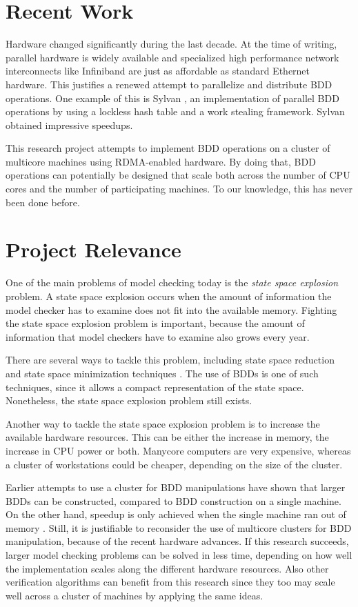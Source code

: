 \section{Recent Work}
Hardware changed significantly during the last decade. At the time of writing, parallel hardware is widely available and specialized high performance network interconnects like Infiniband are just as affordable as standard Ethernet hardware. This justifies a renewed attempt to parallelize and distribute BDD operations. One example of this is Sylvan \cite{sylvan_multicore_bdd}, an implementation of parallel BDD operations by using a lockless hash table and a work stealing framework. Sylvan obtained impressive speedups.

This research project attempts to implement BDD operations on a cluster of multicore machines using RDMA-enabled hardware. By doing that, BDD operations can potentially be designed that scale both across the number of CPU cores and the number of participating machines. To our knowledge, this has never been done before.

\section{Project Relevance}
One of the main problems of model checking today is the \emph{state space explosion} problem. A state space explosion occurs when the amount of information the model checker has to examine does not fit into the available memory. Fighting the state space explosion problem is important, because the amount of information that model checkers have to examine also grows every year. 

There are several ways to tackle this problem, including state space reduction and state space minimization techniques \cite{pater2011partial, blom2005distributed}. The use of BDDs is one of such techniques, since it allows a compact representation of the state space. Nonetheless, the state space explosion problem still exists. 

Another way to tackle the state space explosion problem is to increase the available hardware resources. This can be either the increase in memory, the increase in CPU power or both. Manycore computers are very expensive, whereas a cluster of workstations could be cheaper, depending on the size of the cluster.

Earlier attempts to use a cluster for BDD manipulations have shown that larger BDDs can be constructed, compared to BDD construction on a single machine. On the other hand, speedup is only achieved when the single machine ran out of memory \cite{BDDNOW:parallel_bdd_package}. Still, it is justifiable to reconsider the use of multicore clusters for BDD manipulation, because of the recent hardware advances. If this research succeeds, larger model checking problems can be solved in less time, depending on how well the implementation scales along the different hardware resources. Also other verification algorithms can benefit from this research since they too may scale well across a cluster of machines by applying the same ideas.

